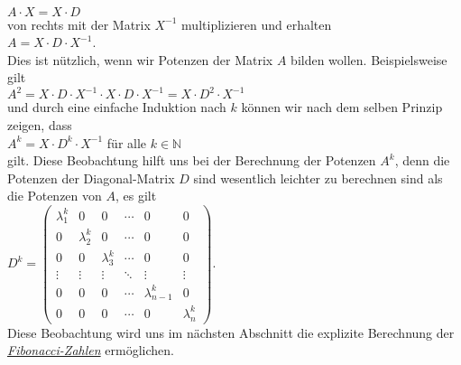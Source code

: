 \\[0.2cm]
\hspace*{1.3cm}
$A \cdot X = X \cdot D$
\\[0.2cm]
von rechts mit der Matrix $X^{-1}$ multiplizieren und erhalten
\\[0.2cm]
\hspace*{1.3cm}
$A = X \cdot D \cdot X^{-1}$.
\\[0.2cm]
Dies ist n\"utzlich, wenn wir Potenzen der Matrix $A$ bilden wollen.  Beispielsweise gilt
\\[0.2cm]
\hspace*{1.3cm}
$A^2 = X \cdot D \cdot X^{-1} \cdot X \cdot D \cdot X^{-1} = X \cdot D^2 \cdot X^{-1}$
\\[0.2cm]
und durch eine einfache Induktion nach $k$ k\"onnen wir nach dem selben Prinzip zeigen, dass
\\[0.2cm]
\hspace*{1.3cm}
$A^k = X \cdot D^k \cdot X^{-1}$ \quad f\"ur alle $k \in \mathbb{N}$
\\[0.2cm]
gilt.  Diese Beobachtung hilft uns bei der Berechnung der Potenzen $A^k$, denn die Potenzen der
Diagonal-Matrix $D$ sind wesentlich  leichter zu berechnen sind als die Potenzen von $A$, es gilt
\\[0.2cm]
\hspace*{1.3cm}
$D^k = \left(
  \begin{array}{llllll}
    \lambda_1^k & 0         & 0         & \cdots & 0 & 0 \\ 
    0           & \lambda_2^k & 0         & \cdots & 0 & 0 \\
    0           & 0         & \lambda_3^k & \cdots & 0 & 0 \\
    \vdots      & \vdots    & \vdots    & \ddots & \vdots & \vdots \\
    0           & 0         & 0         & \cdots  & \lambda_{n-1}^k & 0 \\
    0           & 0         & 0         & \cdots & 0 & \lambda_n^k 
  \end{array}
\right)
$.
\\[0.2cm]
Diese Beobachtung wird uns im n\"achsten Abschnitt die explizite Berechnung der
\href{http://de.wikipedia.org/wiki/Fibonacci-Folge}{\emph{Fibonacci-Zahlen}} erm\"oglichen. 

